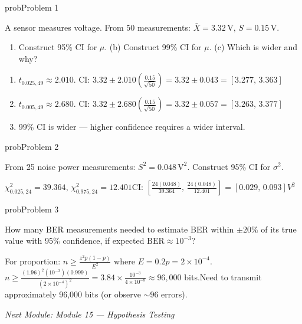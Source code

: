 
\begin{PSbox}[unbreakable]{prob}{Problem 1}

A sensor measures voltage. From 50 measurements: $\bar{X} = 3.32\,\mathrm{V},\, S = 0.15\,\mathrm{V}$.

\begin{enumerate}
\def\labelenumi{(\alph{enumi})}
\tightlist
\item
  Construct 95\% CI for $\mu$. (b) Construct 99\% CI for $\mu$. (c) Which is wider and why?
\end{enumerate}

\PSsolution{} 

\begin{enumerate}
\def\labelenumi{(\alph{enumi})}
\tightlist
\item
  $t_{0.025,49} \approx 2.010$. CI: $3.32 \pm 2.010\left(\frac{0.15}{\sqrt{50}}\right) = 3.32 \pm 0.043 = [3.277,\, 3.363]$
\item
  $t_{0.005,49} \approx 2.680$. CI: $3.32 \pm 2.680\left(\frac{0.15}{\sqrt{50}}\right) = 3.32 \pm 0.057 = [3.263,\, 3.377]$
\item
  99\% CI is wider — higher confidence requires a wider interval.
\end{enumerate}

\end{PSbox}

\begin{PSbox}[unbreakable]{prob}{Problem 2}

From 25 noise power measurements: $S^{2} = 0.048\,\mathrm{V}^{2}$. Construct 95\% CI for $\sigma^{2}$.

\PSsolution{} $\chi^{2}_{0.025,24} = 39.364,\, \chi^{2}_{0.975,24} = 12.401$\PSbr{}CI: $\left[\frac{24(0.048)}{39.364},\, \frac{24(0.048)}{12.401}\right] = [0.029,\, 0.093] V^{2}$

\end{PSbox}

\begin{PSbox}[unbreakable]{prob}{Problem 3}

How many BER measurements needed to estimate BER within $\pm 20\%$ of its true value with 95\% confidence, if expected $\mathrm{BER} \approx 10^{-3}$?

\PSsolution{} For proportion: $n \ge \frac{z^{2}p(1-p)}{E^{2}}$ where $E = 0.2p = 2 \times 10^{-4}$.\PSbr{}$n \ge \frac{(1.96)^{2}(10^{-3})(0.999)}{(2 \times 10^{-4})^{2}} = 3.84 \times \frac{10^{-3}}{4 \times 10^{-8}} \approx 96{,}000$ bits.\PSbr{}Need to transmit approximately 96,000 bits (or observe $\sim 96$ errors).

\emph{Next Module: {Module 15 — Hypothesis Testing}}

\end{PSbox}
